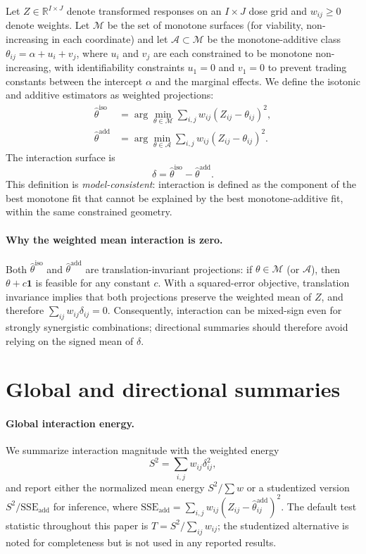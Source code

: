 \documentclass[pdflatex,sn-nature]{sn-jnl}%
\begin{document}
Let $Z\in\mathbb{R}^{I\times J}$ denote transformed responses on an $I\times J$ dose grid and $w_{ij}\ge 0$ denote weights.
Let $\mathcal{M}$ be the set of monotone surfaces (for viability, non-increasing in each coordinate) and let $\mathcal{A}\subset\mathcal{M}$ be the monotone-additive class
$\theta_{ij}=\alpha+u_i+v_j$, where $u_i$ and $v_j$ are each constrained to be monotone non-increasing, with identifiability constraints $u_1=0$ and $v_1=0$ to prevent trading constants between the intercept $\alpha$ and the marginal effects.
We define the isotonic and additive estimators as weighted projections:
\begin{align}
\hat\theta^{\mathrm{iso}} &= \arg\min_{\theta\in\mathcal{M}}\sum_{i,j} w_{ij}(Z_{ij}-\theta_{ij})^2,\\
\hat\theta^{\mathrm{add}} &= \arg\min_{\theta\in\mathcal{A}}\sum_{i,j} w_{ij}(Z_{ij}-\theta_{ij})^2.
\end{align}
The interaction surface is
\begin{equation}
\delta=\hat\theta^{\mathrm{iso}}-\hat\theta^{\mathrm{add}}.
\end{equation}
This definition is \emph{model-consistent}: interaction is defined as the component of the best monotone fit that cannot be explained by the best monotone-additive fit, within the same constrained geometry.

\paragraph{Why the weighted mean interaction is zero.}
Both $\hat\theta^{\mathrm{iso}}$ and $\hat\theta^{\mathrm{add}}$ are translation-invariant projections: if $\theta\in\mathcal{M}$ (or $\mathcal{A}$), then $\theta+c\mathbf{1}$ is feasible for any constant $c$.
With a squared-error objective, translation invariance implies that both projections preserve the weighted mean of $Z$, and therefore $\sum_{ij} w_{ij}\delta_{ij}=0$.
Consequently, interaction can be mixed-sign even for strongly synergistic combinations; directional summaries should therefore avoid relying on the signed mean of $\delta$.

\section{Global and directional summaries}

\paragraph{Global interaction energy.}
We summarize interaction magnitude with the weighted energy
\begin{equation}
S^2=\sum_{i,j} w_{ij}\delta_{ij}^2,
\end{equation}
and report either the normalized mean energy $S^2/\sum w$ or a studentized version $S^2/\mathrm{SSE}_{\mathrm{add}}$ for inference, where
$\mathrm{SSE}_{\mathrm{add}}=\sum_{i,j} w_{ij}(Z_{ij}-\hat\theta^{\mathrm{add}}_{ij})^2$.
The default test statistic throughout this paper is $T = S^2/\sum_{ij} w_{ij}$; the studentized alternative is noted for completeness but is not used in any reported results.
\end{document}
